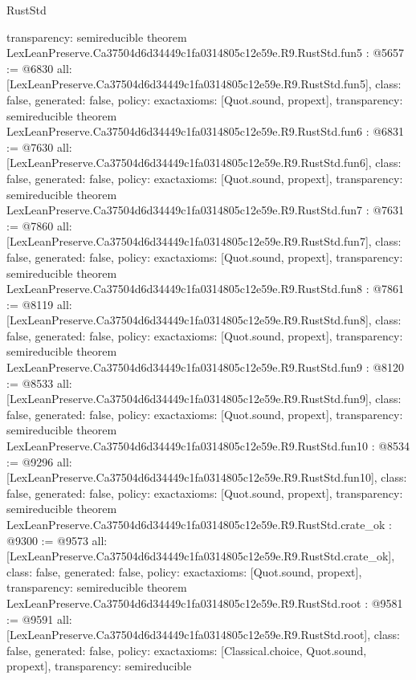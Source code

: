 \begin{lexlean}{RustStd}
\begin{coremodule}
{  transparency: semireducible
}
theorem LexLeanPreserve.Ca37504d6d34449c1fa0314805c12e59e.R9.RustStd.fun5 : @5657 := @6830 {
  all: [LexLeanPreserve.Ca37504d6d34449c1fa0314805c12e59e.R9.RustStd.fun5],
  class: false,
  generated: false,
  policy: exact{axioms: [Quot.sound, propext]},
  transparency: semireducible
}
theorem LexLeanPreserve.Ca37504d6d34449c1fa0314805c12e59e.R9.RustStd.fun6 : @6831 := @7630 {
  all: [LexLeanPreserve.Ca37504d6d34449c1fa0314805c12e59e.R9.RustStd.fun6],
  class: false,
  generated: false,
  policy: exact{axioms: [Quot.sound, propext]},
  transparency: semireducible
}
theorem LexLeanPreserve.Ca37504d6d34449c1fa0314805c12e59e.R9.RustStd.fun7 : @7631 := @7860 {
  all: [LexLeanPreserve.Ca37504d6d34449c1fa0314805c12e59e.R9.RustStd.fun7],
  class: false,
  generated: false,
  policy: exact{axioms: [Quot.sound, propext]},
  transparency: semireducible
}
theorem LexLeanPreserve.Ca37504d6d34449c1fa0314805c12e59e.R9.RustStd.fun8 : @7861 := @8119 {
  all: [LexLeanPreserve.Ca37504d6d34449c1fa0314805c12e59e.R9.RustStd.fun8],
  class: false,
  generated: false,
  policy: exact{axioms: [Quot.sound, propext]},
  transparency: semireducible
}
theorem LexLeanPreserve.Ca37504d6d34449c1fa0314805c12e59e.R9.RustStd.fun9 : @8120 := @8533 {
  all: [LexLeanPreserve.Ca37504d6d34449c1fa0314805c12e59e.R9.RustStd.fun9],
  class: false,
  generated: false,
  policy: exact{axioms: [Quot.sound, propext]},
  transparency: semireducible
}
theorem LexLeanPreserve.Ca37504d6d34449c1fa0314805c12e59e.R9.RustStd.fun10 : @8534 := @9296 {
  all: [LexLeanPreserve.Ca37504d6d34449c1fa0314805c12e59e.R9.RustStd.fun10],
  class: false,
  generated: false,
  policy: exact{axioms: [Quot.sound, propext]},
  transparency: semireducible
}
theorem LexLeanPreserve.Ca37504d6d34449c1fa0314805c12e59e.R9.RustStd.crate_ok : @9300 := @9573 {
  all: [LexLeanPreserve.Ca37504d6d34449c1fa0314805c12e59e.R9.RustStd.crate_ok],
  class: false,
  generated: false,
  policy: exact{axioms: [Quot.sound, propext]},
  transparency: semireducible
}
theorem LexLeanPreserve.Ca37504d6d34449c1fa0314805c12e59e.R9.RustStd.root : @9581 := @9591 {
  all: [LexLeanPreserve.Ca37504d6d34449c1fa0314805c12e59e.R9.RustStd.root],
  class: false,
  generated: false,
  policy: exact{axioms: [Classical.choice, Quot.sound, propext]},
  transparency: semireducible
}


\end{coremodule}
\end{lexlean}
